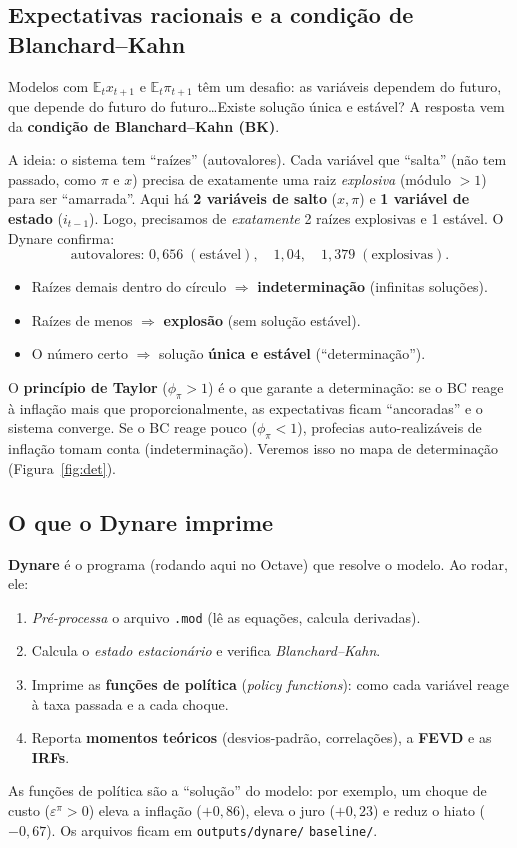 \documentclass[11pt,a4paper]{article}
\begin{document}
\subsection{Expectativas racionais e a condição de Blanchard--Kahn}
\label{sec:det}
Modelos com $\mathbb{E}_t x_{t+1}$ e $\mathbb{E}_t\pi_{t+1}$ têm um desafio: as variáveis dependem do
futuro, que depende do futuro do futuro\ldots Existe solução única e estável? A resposta vem da
\textbf{condição de Blanchard--Kahn (BK)}.

A ideia: o sistema tem ``raízes'' (autovalores). Cada variável que ``salta'' (não tem passado, como
$\pi$ e $x$) precisa de exatamente uma raiz \emph{explosiva} (módulo $>1$) para ser ``amarrada''. Aqui
há \textbf{2 variáveis de salto} ($x,\pi$) e \textbf{1 variável de estado} ($i_{t-1}$). Logo,
precisamos de \emph{exatamente} 2 raízes explosivas e 1 estável. O Dynare confirma:
\[
\text{autovalores: } 0{,}656 \;(\text{estável}), \quad 1{,}04, \quad 1{,}379 \;(\text{explosivas}).
\]
\begin{itemize}[nosep]
  \item Raízes demais dentro do círculo $\Rightarrow$ \textbf{indeterminação} (infinitas soluções).
  \item Raízes de menos $\Rightarrow$ \textbf{explosão} (sem solução estável).
  \item O número certo $\Rightarrow$ solução \textbf{única e estável} (``determinação'').
\end{itemize}

\begin{intuicao}
O \textbf{princípio de Taylor} ($\phi_\pi>1$) é o que garante a determinação: se o BC reage à inflação
mais que proporcionalmente, as expectativas ficam ``ancoradas'' e o sistema converge. Se o BC reage
pouco ($\phi_\pi<1$), profecias auto-realizáveis de inflação tomam conta (indeterminação). Veremos
isso no mapa de determinação (Figura~\ref{fig:det}).
\end{intuicao}

\subsection{O que o Dynare imprime}
\textbf{Dynare} é o programa (rodando aqui no Octave) que resolve o modelo. Ao rodar, ele:
\begin{enumerate}[nosep]
  \item \emph{Pré-processa} o arquivo \texttt{.mod} (lê as equações, calcula derivadas).
  \item Calcula o \emph{estado estacionário} e verifica \emph{Blanchard--Kahn}.
  \item Imprime as \textbf{funções de política} (\emph{policy functions}): como cada variável reage à
        taxa passada e a cada choque.
  \item Reporta \textbf{momentos teóricos} (desvios-padrão, correlações), a \textbf{FEVD} e as
        \textbf{IRFs}.
\end{enumerate}
As funções de política são a ``solução'' do modelo: por exemplo, um choque de custo
($\varepsilon^\pi>0$) eleva a inflação ($+0{,}86$), eleva o juro ($+0{,}23$) e reduz o hiato
($-0{,}67$). Os arquivos ficam em \texttt{outputs/dynare/}\allowbreak
\texttt{baseline/}.
\end{document}
